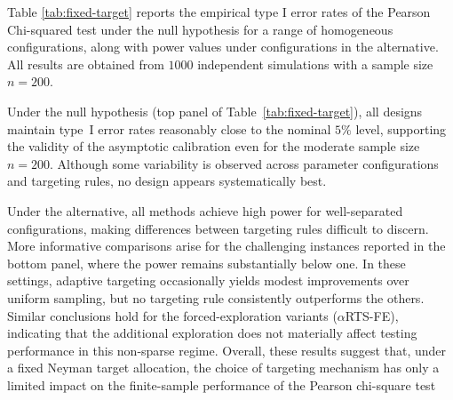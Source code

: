 \documentclass[11pt]{article}
\theoremstyle{plain}
\theoremstyle{definition}
\begin{document}
Table \ref{tab:fixed-target} reports the empirical type I error rates of the Pearson Chi-squared test under the null hypothesis for a range of homogeneous configurations, along with power values under configurations in the alternative. All results are obtained from $1000$ independent simulations with a sample size $n=200$.

%

Under the null hypothesis (top panel of Table~\ref{tab:fixed-target}),
	all designs maintain type~I error rates reasonably close to the nominal
	\(5\%\) level, supporting the validity of the asymptotic calibration even
	for the moderate sample size \(n=200\). Although some variability is
	observed across parameter configurations and targeting rules, no design
	appears systematically best.
	
	Under the alternative, all methods achieve high power for well-separated configurations, making differences between targeting rules difficult to discern. More informative comparisons arise for the challenging instances reported in the bottom panel, where the power remains substantially below one. In these settings, adaptive targeting occasionally yields modest
	improvements over uniform sampling, but no targeting rule consistently outperforms the others. Similar conclusions hold for the forced-exploration variants (\(\alpha\)RTS-FE), indicating that the
	additional exploration does not materially affect testing performance in this non-sparse regime.	Overall, these results suggest that, under a fixed Neyman target allocation, the choice of targeting mechanism has only a limited impact on the finite-sample performance of the Pearson chi-square test
\end{document}
